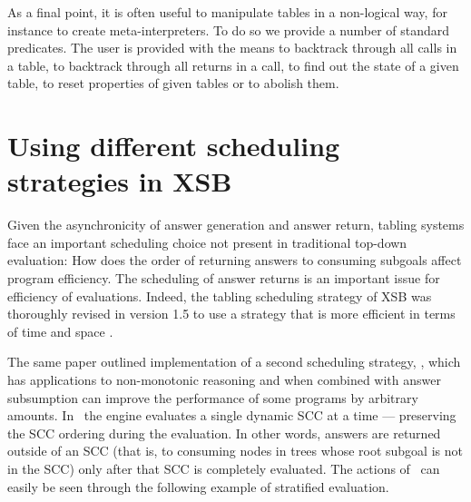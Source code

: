 As a final point, it is often useful to manipulate tables in a
non-logical way, for instance to create meta-interpreters.  To do so
we provide a number of standard predicates.  The user is provided with
the means to backtrack through all calls in a table, to backtrack
through all returns in a call, to find out the state of a given table,
to reset properties of given tables or to abolish them.

\section{Using different scheduling strategies in XSB}

Given the asynchronicity of answer generation and answer return,
tabling systems face an important scheduling choice not present in
traditional top-down evaluation: How does the order of returning
answers to consuming subgoals affect program efficiency.  The
scheduling of answer returns is an important issue for efficiency of
evaluations.  Indeed, the tabling scheduling strategy of XSB was
thoroughly revised in version 1.5 to use a strategy that is more
efficient in terms of time and space \cite{JFLP-Scheduling}.

The same paper outlined implementation of a second scheduling
strategy, \localsched, which has applications to non-monotonic
reasoning and when combined with answer subsumption can improve the
performance of some programs by arbitrary amounts. In \localsched\ the
engine evaluates a single dynamic SCC at a time --- preserving the SCC
ordering during the evaluation.  In other words, answers are returned
outside of an SCC (that is, to consuming nodes in trees whose root
subgoal is not in the SCC) only after that SCC is completely
evaluated.  The actions of \localsched\ can easily be seen through the
following example of stratified evaluation.

